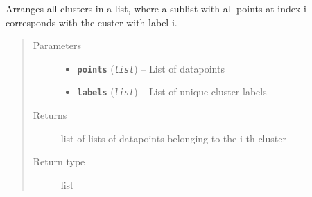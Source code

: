 \documentclass[letterpaper,10pt,english]{sphinxmanual}
\begin{document}
\begin{fulllineitems}
\label{src.clustering:src.clustering.cluster_mappings.aggregate_cluster}
Arranges all clusters in a list, where a sublist with all points at index i corresponds with the
custer with label i.
\begin{quote}\begin{description}
\item[{Parameters}] \leavevmode\begin{itemize}
\item {} 
\textbf{\texttt{points}} (\emph{\texttt{list}}) -- List of datapoints

\item {} 
\textbf{\texttt{labels}} (\emph{\texttt{list}}) -- List of unique cluster labels

\end{itemize}

\item[{Returns}] \leavevmode
list of lists of datapoints belonging to the i-th cluster

\item[{Return type}] \leavevmode
list

\end{description}\end{quote}

\end{fulllineitems}


\begin{fulllineitems}
\label{src.clustering:src.clustering.cluster_mappings.alt}
\end{fulllineitems}


\begin{fulllineitems}
\label{src.clustering:src.clustering.cluster_mappings.cluster_mappings}
\end{fulllineitems}
\end{document}
